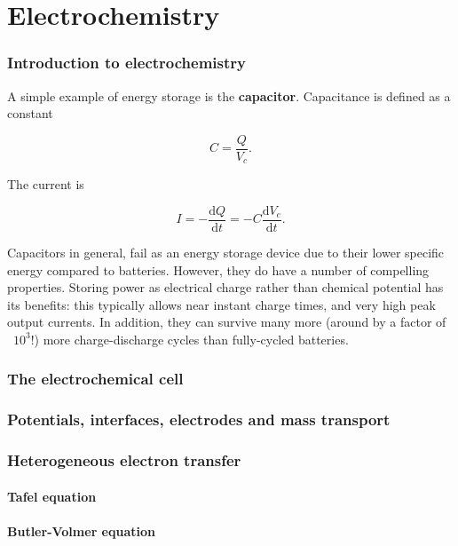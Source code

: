 \documentclass{article}
\numberwithin{theorem}{section}
\numberwithin{corollary}{section}
\numberwithin{postulate}{section}
\numberwithin{lemma}{section}
\numberwithin{definition}{section}
\begin{document}
\part{Electrochemistry}

\section{Introduction to electrochemistry}

A simple example of energy storage is the \textbf{capacitor}. Capacitance is
defined as a constant

\begin{equation}
  C = \frac{Q}{V_c}.
\end{equation}

The current is

\begin{equation}
  I = -\frac{\mathrm{d}Q}{\mathrm{d}t} = -C \frac{\mathrm{d}V_c}{\mathrm{d}t}.
\end{equation}

Capacitors in general, fail as an energy storage device due to their lower
specific energy compared to batteries. However, they do have a number of
compelling properties. Storing power as electrical charge rather than chemical
potential has its benefits: this typically allows near instant charge times, and
very high peak output currents. In addition, they can survive many more (around
by a factor of ~$10^3$!) more charge-discharge cycles than fully-cycled
batteries.

\section{The electrochemical cell}

\section{Potentials, interfaces, electrodes and mass transport}

\section{Heterogeneous electron transfer}

\subsection{Tafel equation}

\subsection{Butler-Volmer equation}
\end{document}
